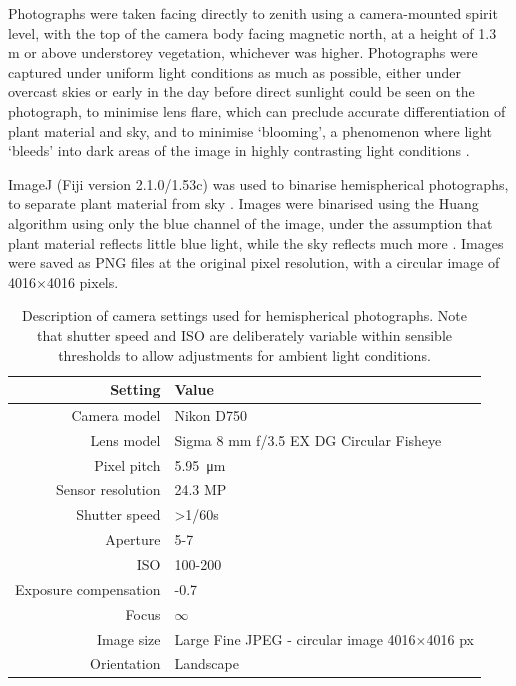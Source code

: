 \documentclass[11pt,a4paper]{article}
\begin{document}
Photographs were taken facing directly to zenith using a camera-mounted spirit level, with the top of the camera body facing magnetic north, at a height of 1.3 m or above understorey vegetation, whichever was higher. Photographs were captured under uniform light conditions as much as possible, either under overcast skies or early in the day before direct sunlight could be seen on the photograph, to minimise lens flare, which can preclude accurate differentiation of plant material and sky, and to minimise `blooming', a phenomenon where light `bleeds' into dark areas of the image in highly contrasting light conditions \citep{Frazer2001}.

ImageJ (Fiji version 2.1.0/1.53c) was used to binarise hemispherical photographs, to separate plant material from sky \citep{Schneider2012}. Images were binarised using the Huang algorithm \citep{Huang1995} using only the blue channel of the image, under the assumption that plant material reflects little blue light, while the sky reflects much more \citep{Brusa2014}. Images were saved as PNG files at the original pixel resolution, with a circular image of 4016$\times$4016 pixels.

\begin{table}
\centering 
  \caption{Description of camera settings used for hemispherical photographs. Note that shutter speed and ISO are deliberately variable within sensible thresholds to allow adjustments for ambient light conditions.} 
  \label{camera_settings} 
\begin{tabular}{rl} 
	\toprule
{Setting} & {Value} \\
	\midrule
Camera model & Nikon D750 \\
Lens model & Sigma 8 mm f/3.5 EX DG Circular Fisheye \\
Pixel pitch & \SI{5.95}{\micro\meter} \\
Sensor resolution & 24.3 MP \\
Shutter speed & >1/60s \\
Aperture & 5-7 \\
ISO & 100-200 \\
Exposure compensation & -0.7 \citep{Brusa2014} \\
Focus & $\infty$ \citep{Hu2009, Frazer2001}\\
Image size & Large Fine JPEG - circular image 4016$\times$4016 px \\
Orientation & Landscape \\
\bottomrule
\end{tabular} 
\end{table} 
\end{document}
